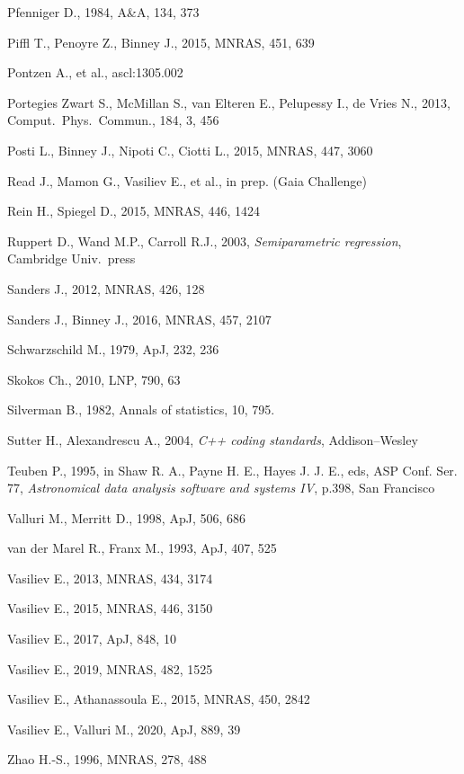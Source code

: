 \documentclass[12pt]{article}
\begin{document}
\begin{thebibliography}{99}
Pfenniger D., 1984, A\&A, 134, 373

Piffl T., Penoyre Z., Binney J., 2015, MNRAS, 451, 639

Pontzen A., et al., ascl:1305.002

Portegies Zwart S., McMillan S., van Elteren E., Pelupessy I., de Vries N., 2013, Comput.\ Phys.\ Commun., 184, 3, 456

Posti L., Binney J., Nipoti C., Ciotti L., 2015, MNRAS, 447, 3060

Read J., Mamon G., Vasiliev E., et al., in prep. (Gaia Challenge)

Rein H., Spiegel D., 2015, MNRAS, 446, 1424

Ruppert D., Wand M.P., Carroll R.J., 2003, \textsl{Semiparametric regression}, Cambridge Univ.\ press

Sanders J., 2012, MNRAS, 426, 128

Sanders J., Binney J., 2016, MNRAS, 457, 2107

Schwarzschild M., 1979, ApJ, 232, 236

Skokos Ch., 2010, LNP, 790, 63

Silverman B., 1982, Annals of statistics, 10, 795.

Sutter H., Alexandrescu A., 2004, \textsl{C++ coding standards}, Addison--Wesley

Teuben P., 1995, in Shaw R. A., Payne H. E., Hayes J. J. E., eds, ASP Conf. Ser. 77,
\textsl{Astronomical data analysis software and systems IV}, p.398, San Francisco

Valluri M., Merritt D., 1998, ApJ, 506, 686

van der Marel R., Franx M., 1993, ApJ, 407, 525

Vasiliev E., 2013, MNRAS, 434, 3174

Vasiliev E., 2015, MNRAS, 446, 3150

Vasiliev E., 2017, ApJ, 848, 10

Vasiliev E., 2019, MNRAS, 482, 1525

Vasiliev E., Athanassoula E., 2015, MNRAS, 450, 2842

Vasiliev E., Valluri M., 2020, ApJ, 889, 39

Zhao H.-S., 1996, MNRAS, 278, 488

\end{thebibliography}
\end{document}
